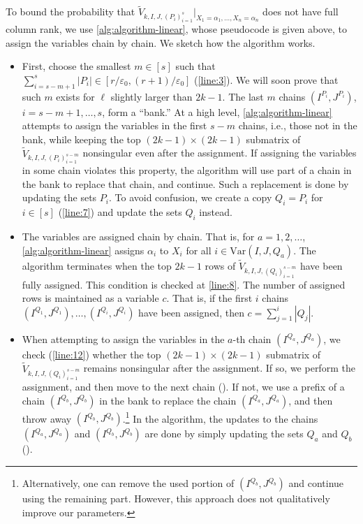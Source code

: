 \documentclass[11pt]{article}
\theoremstyle{plain}
\theoremstyle{definition}
\theoremstyle{remark}
\newcommand{\eps}{\varepsilon}
\newcommand{\var}{\mathrm{Var}}
\begin{document}
To bound the probability that $\widetilde{V}_{k,I,J,(P_i)_{i=1}^s}|_{X_1=\alpha_1,\dots,X_n=\alpha_n}$ does not have full column rank, we use \cref{alg:algorithm-linear}, whose pseudocode is given above, to assign the variables chain by chain. We sketch how the algorithm works.
\begin{itemize}
\item First, choose the smallest $m\in [s]$ such that $\sum_{i=s-m+1}^s |P_i|\in [r/\eps_0, (r+1)/\eps_0]$ (\cref{line:3}). We will soon prove that such $m$ exists for $\ell$ slightly larger than $2k-1$. The last $m$ chains $(I^{P_i}, J^{P_i})$, $i=s-m+1,\dots,s$, form a ``bank.'' At a high level, \cref{alg:algorithm-linear} attempts to assign the variables in the first $s-m$ chains, i.e., those not in the bank, while keeping the top $(2k-1)\times (2k-1)$ submatrix of $\widetilde{V}_{k,I,J,(P_i)_{i=1}^{s-m}}$ nonsingular even after the assignment.
If assigning the variables in some chain violates this property, the algorithm will use part of a chain in the bank to replace that chain, and continue. Such a replacement is done by updating the sets $P_i$. To avoid confusion, we create a copy $Q_i=P_i$ for $i\in [s]$ (\cref{line:7}) and update the sets $Q_i$ instead.

\item The variables are assigned chain by chain. That is, for $a=1,2,\dots$, \cref{alg:algorithm-linear} assigns $\alpha_i$ to $X_i$ for all $i\in \var(I,J,Q_a)$.
The algorithm terminates when the top $2k-1$ rows of $\widetilde{V}_{k,I,J,(Q_i)_{i=1}^{s-m}}$ have been fully assigned. This condition is checked at \cref{line:8}. The number of assigned rows is maintained as a variable $c$. That is, if the first $i$ chains $(I^{Q_1}, J^{Q_1}),\dots, (I^{Q_i}, J^{Q_i})$ have been assigned, then $c=\sum_{j=1}^{i} |Q_j|$.


\item 
When attempting to assign the variables in the $a$-th chain $(I^{Q_a}, J^{Q_a})$, we check (\cref{line:12}) whether the top $(2k-1)\times (2k-1)$ submatrix of $\widetilde{V}_{k,I,J,(Q_i)_{i=1}^{s-m}}$ remains nonsingular after the assignment. If so, we perform the assignment, and then move to the next chain (). If not, we use a prefix of a chain $(I^{Q_{b}}, J^{Q_{b}})$ in the bank to replace the chain $(I^{Q_a}, J^{Q_a})$, and then throw away $(I^{Q_{b}}, J^{Q_{b}})$.\footnote{Alternatively, one can remove the used portion of $(I^{Q_{b}}, J^{Q_{b}})$ and continue using the remaining part. However, this approach does not qualitatively improve our parameters.}
In the algorithm, the updates to the chains $(I^{Q_a}, J^{Q_a})$ and $(I^{Q_{b}}, J^{Q_{b}})$ are done by simply updating the sets $Q_a$ and $Q_{b}$ (). 


\end{itemize}
\end{document}
